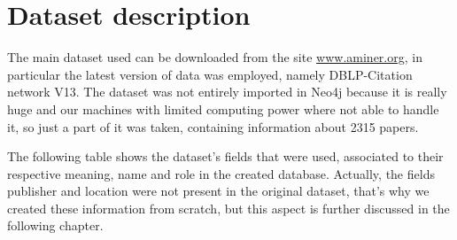 \chapter{Dataset description}
\label{ch:dataset_description}%
The main dataset used can be downloaded from the site \href{https://www.aminer.org/citation}{www.aminer.org}, in particular the latest version of data was employed, namely DBLP-Citation network V13.
The dataset was not entirely imported in Neo4j because it is really huge and our machines with limited computing power where not able to handle it, so just a part of it was taken, containing information about 2315 papers.

The following table shows the dataset's fields that were used, associated to their respective meaning, name and role in the created database.
Actually, the fields publisher and location were not present in the original dataset, that's why we created these information from scratch, but this aspect is further discussed in the following chapter.
